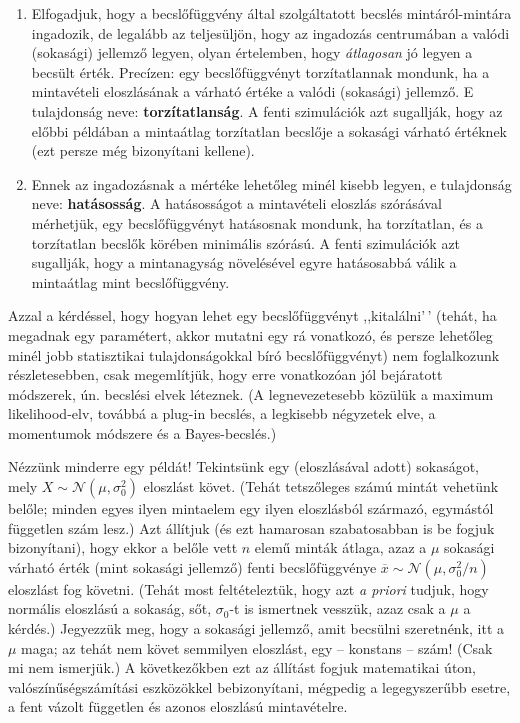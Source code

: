 \documentclass[
]{book}
\providecommand{\tightlist}{%
  \setlength{\itemsep}{0pt}\setlength{\parskip}{0pt}}
\begin{document}
\begin{enumerate}
\def\labelenumi{\arabic{enumi}.}
\tightlist
\item
  Elfogadjuk, hogy a becslőfüggvény által szolgáltatott becslés mintáról-mintára ingadozik, de legalább az teljesüljön, hogy az ingadozás centrumában a valódi (sokasági) jellemző legyen, olyan értelemben, hogy \emph{átlagosan} jó legyen a becsült érték. Precízen: egy becslőfüggvényt torzítatlannak mondunk, ha a mintavételi eloszlásának a várható értéke a valódi (sokasági) jellemző. E tulajdonság neve: \textbf{torzítatlanság}. A fenti szimulációk azt sugallják, hogy az előbbi példában a mintaátlag torzítatlan becslője a sokasági várható értéknek (ezt persze még bizonyítani kellene).
\item
  Ennek az ingadozásnak a mértéke lehetőleg minél kisebb legyen, e tulajdonság neve: \textbf{hatásosság}. A hatásosságot a mintavételi eloszlás szórásával mérhetjük, egy becslőfüggvényt hatásosnak mondunk, ha torzítatlan, és a torzítatlan becslők körében minimális szórású. A fenti szimulációk azt sugallják, hogy a mintanagyság növelésével egyre hatásosabbá válik a mintaátlag mint becslőfüggvény.
\end{enumerate}

Azzal a kérdéssel, hogy hogyan lehet egy becslőfüggvényt ,,kitalálni'\,' (tehát, ha megadnak egy paramétert, akkor mutatni egy rá vonatkozó, és persze lehetőleg minél jobb statisztikai tulajdonságokkal bíró becslőfüggvényt) nem foglalkozunk részletesebben, csak megemlítjük, hogy erre vonatkozóan jól bejáratott módszerek, ún. becslési elvek léteznek. (A legnevezetesebb közülük a maximum likelihood-elv, továbbá a plug-in becslés, a legkisebb négyzetek elve, a momentumok módszere és a Bayes-becslés.)

Nézzünk minderre egy példát! Tekintsünk egy (eloszlásával adott) sokaságot, mely \(X\sim\mathcal{N}\left(\mu,\sigma_0^2\right)\) eloszlást követ. (Tehát tetszőleges számú mintát vehetünk belőle; minden egyes ilyen mintaelem egy ilyen eloszlásból származó, egymástól független szám lesz.) Azt állítjuk (és ezt hamarosan szabatosabban is be fogjuk bizonyítani), hogy ekkor a belőle vett \(n\) elemű minták átlaga, azaz a \(\mu\) sokasági várható érték (mint sokasági jellemző) fenti becslőfüggvénye \(\overline{x}\sim\mathcal{N}\left(\mu,\sigma_0^2/n\right)\) eloszlást fog követni. (Tehát most feltételeztük, hogy azt \emph{a priori} tudjuk, hogy normális eloszlású a sokaság, sőt, \(\sigma_0\)-t is ismertnek vesszük, azaz csak a \(\mu\) a kérdés.) Jegyezzük meg, hogy a sokasági jellemző, amit becsülni szeretnénk, itt a \(\mu\) maga; az tehát nem követ semmilyen eloszlást, egy -- konstans -- szám! (Csak mi nem ismerjük.) A következőkben ezt az állítást fogjuk matematikai úton, valószínűségszámítási eszközökkel bebizonyítani, mégpedig a legegyszerűbb esetre, a fent vázolt független és azonos eloszlású mintavételre.
\end{document}
